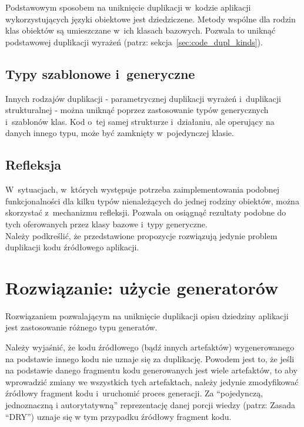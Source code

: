 Podstawowym sposobem na uniknięcie duplikacji w~kodzie aplikacji wykorzystujących języki obiektowe jest dziedziczene.
Metody wspólne dla rodzin klas obiektów są umieszczane w~ich klasach bazowych.
Pozwala to uniknąć podstawowej duplikacji wyrażeń (patrz: sekcja~\ref{sec:code_dupl_kinds}).


\subsection{Typy szablonowe i~generyczne}

Innych rodzajów duplikacji - parametrycznej duplikacji wyrażeń i~duplikacji strukturalnej - można uniknąć poprzez zastosowanie typów generycznych i~szablonów klas.
Kod o~tej samej strukturze i~działaniu, ale operujący na danych innego typu, może być zamknięty w~pojedynczej klasie.


\subsection{Refleksja}

W~sytuacjach, w~których występuje potrzeba zaimplementowania podobnej funkcjonalności dla kilku typów nienależących do jednej rodziny obiektów, można skorzystać z~mechanizmu refleksji.
Pozwala on osiągnąć rezultaty podobne do tych oferowanych przez klasy bazowe i~typy generyczne.\\


Należy podkreślić, że przedstawione propozycje rozwiązują jedynie problem duplikacji kodu źródłowego aplikacji.


\section{Rozwiązanie: użycie generatorów}

Rozwiązaniem pozwalającym na uniknięcie duplikacji opisu dziedziny aplikacji jest zastosowanie różnego typu generatów.

Należy wyjaśnić, że kodu źródłowego (bądź innych artefaktów) wygenerowanego na podstawie innego kodu nie uznaje się za duplikację.
Powodem jest to, że jeśli na podstawie danego fragmentu kodu generowanych jest wiele artefaktów, to aby wprowadzić zmiany we wszystkich tych artefaktach, należy jedynie  zmodyfikować źródłowy fragment kodu i~uruchomić proces generacji.
Za ``pojedynczą, jednoznaczną i autorytatywną'' reprezentację danej porcji wiedzy (patrz: Zasada ``DRY'') uznaje się w tym przypadku źródłowy fragment kodu.


